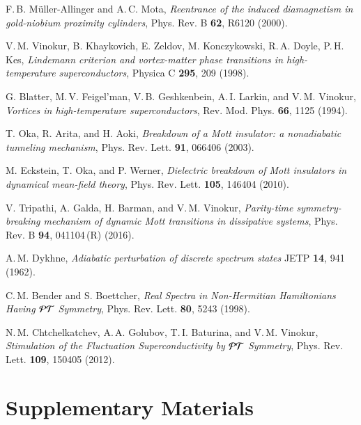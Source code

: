 \documentclass[aps,twocolumn,prl,10pt,amsmath,amssymb,nofootinbib,showpacs,superscriptaddress,floatfix]{revtex4-1}
\begin{document}
\begin{thebibliography}{10}
F.\,B. M\"{u}ller-Allinger and A.\,C. Mota,
\textit{Reentrance of the induced diamagnetism in gold-niobium proximity cylinders}, 
Phys. Rev. B \textbf{62}, R6120 (2000).

V.\,M. Vinokur, B. Khaykovich, E. Zeldov, M. Konczykowski, R.\,A. Doyle,
P.\,H. Kes,
\textit{Lindemann criterion and vortex-matter phase transitions in high-temperature superconductors},
Physica C \textbf{295}, 209 (1998).

G. Blatter, M.\,V. Feigel'man, V.\,B. Geshkenbein, A.\,I. Larkin, and V.\,M. Vinokur,
\textit{Vortices in high-temperature superconductors},
Rev. Mod. Phys. \textbf{66}, 1125 (1994).

T. Oka, R. Arita, and H. Aoki,
\textit{Breakdown of a Mott insulator: a nonadiabatic tunneling mechanism}, Phys. Rev. Lett. \textbf{91}, 066406 (2003).

M. Eckstein, T. Oka, and P. Werner,
\textit{Dielectric breakdown of Mott insulators in dynamical mean-field theory}, 
Phys. Rev. Lett. \textbf{105}, 146404 (2010).

V. Tripathi, A. Galda, H. Barman, and V.\,M. Vinokur, \textit{Parity-time symmetry-breaking mechanism of dynamic Mott transitions in dissipative systems},
Phys. Rev. B \textbf{94}, 041104\,(R) (2016).

A.\,M. Dykhne, \textit{Adiabatic perturbation of discrete spectrum states}
JETP \textbf{14}, 941 (1962).

C.\,M. Bender and S. Boettcher, \textit{Real Spectra in Non-Hermitian Hamiltonians Having ${\cal PT}$ Symmetry}, 
Phys. Rev. Lett. \textbf{80}, 5243 (1998).

N.\,M. Chtchelkatchev, A.\,A. Golubov, T.\,I. Baturina, and V.\,M. Vinokur,
\textit{Stimulation of the Fluctuation Superconductivity by $\cal{PT}$ Symmetry}, 
Phys. Rev. Lett. \textbf{109}, 150405 (2012).


\end{thebibliography}
\section{Supplementary Materials}
\end{document}
